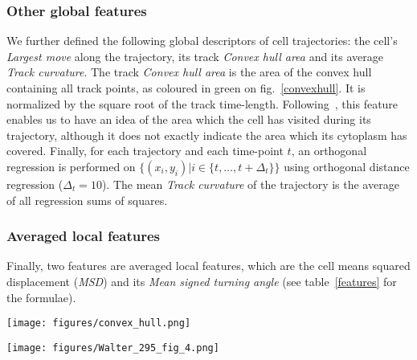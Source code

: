 
\subsubsection{Other global features}
We further defined the following global descriptors of cell
trajectories: the cell's \textit{Largest move} along the trajectory, its track
\textit{Convex hull area} and its average \textit{Track
  curvature}. The track \textit{Convex hull area} is the area of the
convex hull containing all track points, as coloured in green on
fig.~\ref{convexhull}. It is normalized by the square root of the
track time-length. Following~\cite{pmid18213366}, this feature enables
us to have an idea of the area which the cell has visited during its
trajectory, although it does not exactly indicate the area which its
cytoplasm has covered. Finally, for each trajectory and each time-point $t$, an orthogonal regression is performed on $\{(x_i, y_i) | i \in \{t,\ldots, t+\Delta_t\} \}$ using orthogonal distance regression ($\Delta_t=10$). The mean \textit{Track curvature} of the trajectory is the average of all regression sums of squares. 
\subsubsection{Averaged local features}
Finally, two features are averaged local features, which are the cell
means squared displacement
(\textit{MSD}) and its \textit{Mean signed turning angle} (see table~\ref{features} for the formulae). 
\begin{figure*}[!ht]%
\centerline{\texttt{[image: figures/convex\_hull.png]}}
\caption{Convex hull of the example track from figure~\ref{fig:01}}
\label{convexhull}
\end{figure*}
\begin{figure*}[!tpb]%
\centerline{\texttt{[image: figures/Walter\_295\_fig\_4.png]}}
\caption{Heatmap showing trajectory feature similarities on a subset of the Mitocheck dataset (1.1 million trajectories coming from detected motility hit experiments according to MotIW). The dengrograms were obtained using the \textit{Ward} method and the euclidean distance between feature correlations.}\label{correlations}
\end{figure*}
